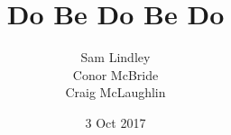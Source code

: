 \documentclass[11pt]{article}
\date{3 Oct 2017}
\begin{document}



\title{Do Be Do Be Do}


\author{Sam Lindley \\ Conor McBride \\ Craig McLaughlin}

\maketitle


\end{document}
